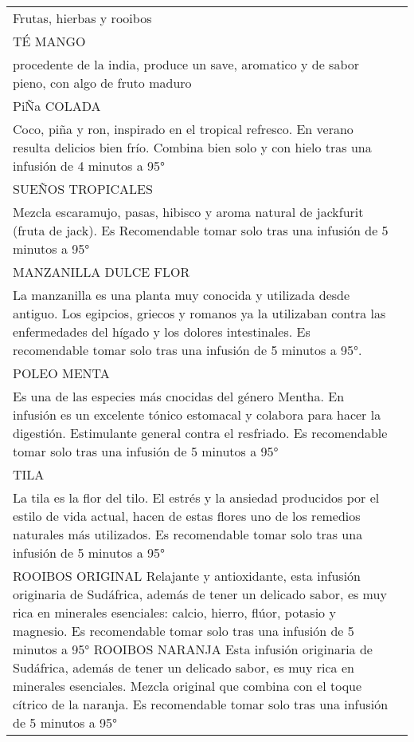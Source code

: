 \documentclass[12pt]{article}
\makeatletter
\newcommand*\ColText[1]{\textcolor{Goldenrod3}{#1}}
\newenvironment{Group}[1]
{\noindent\begin{tabular*}{\textwidth}{@{}p{1\linewidth}@{\extracolsep{\fill}}r@{}}
{\fontsize{24}{29}\selectfont\ColText{#1}}
              \\[0.8em]}
              {
\end{tabular*}}
\newcommand*\Entry[1]{%
    \sffamily#1}
\newcommand*\Expl[1]{%
    \hspace*{1em}\footnotesize #1}
\makeatother
\begin{document}
    \begin{Group}{Frutas, hierbas y rooibos}
        \Entry{TÉ MANGO} \\
        \Expl{procedente de la india, produce un save, aromatico y de sabor pieno, con algo de fruto maduro} \\
        \Entry{PiÑa COLADA} \\
        \Expl{Coco, piña y ron, inspirado en el tropical refresco. En verano resulta delicios bien frío. Combina bien solo y con hielo tras una infusión de 4 minutos a 95°} \\
        \Entry{SUEÑOS TROPICALES} \\
        \Expl{Mezcla escaramujo, pasas, hibisco y aroma natural de jackfurit (fruta de jack). Es Recomendable tomar solo tras una infusión de 5 minutos a 95°} \\
        \Entry{MANZANILLA DULCE FLOR} \\
        \Expl{La manzanilla es una planta muy conocida y utilizada desde antiguo. Los egipcios, griecos y romanos ya la utilizaban contra las enfermedades del hígado y los dolores intestinales. Es recomendable tomar solo tras una infusión de 5 minutos a 95°.} \\
        \Entry{POLEO MENTA} \\
        \Expl{Es una de las especies más cnocidas del género Mentha. En infusión es un excelente tónico estomacal y colabora para hacer la digestión. Estimulante general contra el resfriado. Es recomendable tomar solo tras una infusión de 5 minutos a 95°} \\
        \Entry{TILA} \\
        \Expl{La tila es la flor del tilo. El estrés y la ansiedad producidos por el estilo de vida actual, hacen de estas flores uno de los remedios naturales más utilizados. Es recomendable tomar solo tras una infusión de 5 minutos a 95°} \\
        \Entry{ROOIBOS ORIGINAL}
        \Expl{Relajante y antioxidante, esta infusión originaria de Sudáfrica, además de tener un delicado sabor, es muy rica en minerales esenciales: calcio, hierro, flúor, potasio y magnesio. Es recomendable tomar solo tras una infusión de 5 minutos a 95°}
        \Entry{ROOIBOS NARANJA}
        \Expl{Esta infusión originaria de Sudáfrica, además de tener un delicado sabor, es muy rica en minerales esenciales. Mezcla original que combina con el toque cítrico de la naranja. Es recomendable tomar solo tras una infusión de 5 minutos a 95°}
    \end{Group}

    \vfill
\end{document}
